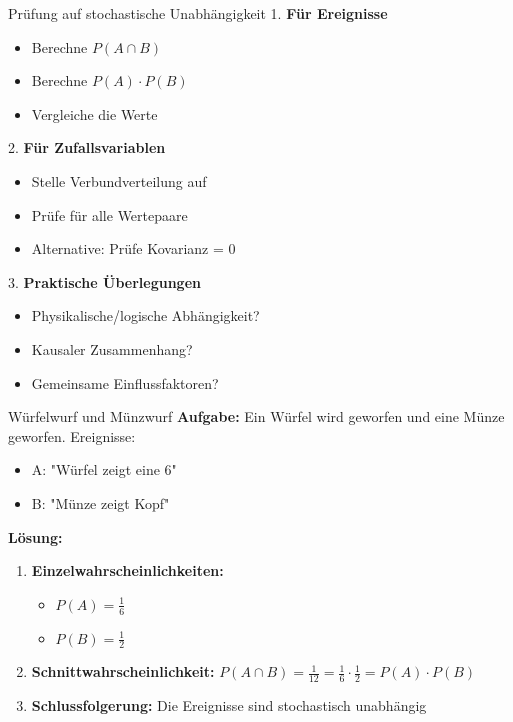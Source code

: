 \begin{KR}{Prüfung auf stochastische Unabhängigkeit}
1. \textbf{Für Ereignisse}
   \begin{itemize}
   \item Berechne $P(A \cap B)$
   \item Berechne $P(A) \cdot P(B)$
   \item Vergleiche die Werte
   \end{itemize}

2. \textbf{Für Zufallsvariablen}
   \begin{itemize}
   \item Stelle Verbundverteilung auf
   \item Prüfe für alle Wertepaare
   \item Alternative: Prüfe Kovarianz = 0
   \end{itemize}

3. \textbf{Praktische Überlegungen}
   \begin{itemize}
   \item Physikalische/logische Abhängigkeit?
   \item Kausaler Zusammenhang?
   \item Gemeinsame Einflussfaktoren?
   \end{itemize}
\end{KR}


\begin{example2}{Würfelwurf und Münzwurf}
\textbf{Aufgabe:} Ein Würfel wird geworfen und eine Münze geworfen.
Ereignisse:
\begin{itemize}
\item A: "Würfel zeigt eine 6"
\item B: "Münze zeigt Kopf"
\end{itemize}

\textbf{Lösung:}
\begin{enumerate}
\item \textbf{Einzelwahrscheinlichkeiten:}
   \begin{itemize}
   \item $P(A) = \frac{1}{6}$
   \item $P(B) = \frac{1}{2}$
   \end{itemize}

\item \textbf{Schnittwahrscheinlichkeit:}
   $P(A \cap B) = \frac{1}{12} = \frac{1}{6} \cdot \frac{1}{2} = P(A) \cdot P(B)$

\item \textbf{Schlussfolgerung:} Die Ereignisse sind stochastisch unabhängig
\end{enumerate}
\end{example2}

